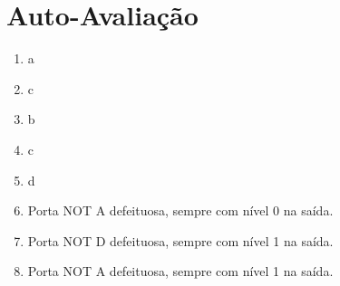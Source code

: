 \documentclass[12pt]{article}
\begin{document}




\newpage 
\section*{Auto-Avaliação}

\begin{enumerate}
    \item a
    \item c
    \item b
    \item c
    \item d
    \item Porta NOT A defeituosa, sempre com nível 0 na saída.
    \item Porta NOT D defeituosa, sempre com nível 1 na saída. 
    \item Porta NOT A defeituosa, sempre com nível 1 na saída.
\end{enumerate}
\end{document}
